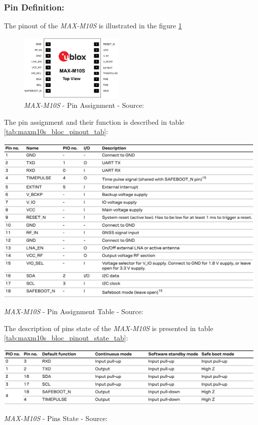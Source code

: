 \documentclass[report.tex]{subfiles}
\begin{document}
\subsubsection{Pin Definition:}

The pinout of the \textit{MAX-M10S} is illustrated in the figure \ref{fig:maxm10s_bloc_pinout}

\begin{figure}[H]
	\centering
	\includegraphics[width=0.45\textwidth]{Include/Figure/comp/maxm10s_bloc_pinout.png}
	\caption{\textit{MAX-M10S} - Pin Assignment - Source: \cite{MAXM10S}}
	\label{fig:maxm10s_bloc_pinout}
\end{figure}

The pin assignment and their function is described in table \ref{tab:maxm10s_bloc_pinout_tab}:

\begin{table}[H]
	\centering
	\includegraphics[width=1\textwidth]{Include/Figure/comp/maxm10s_bloc_pinout_tab.png}
\caption{\textit{MAX-M10S} - Pin Assignment Table - Source: \cite{MAXM10S}}
\label{tab:maxm10s_bloc_pinout_tab}
\end{table}

The description of pins state of the \textit{MAX-M10S} is presented in table \ref{tab:maxm10s_bloc_pinout_state_tab}:

\begin{table}[H]
	\centering
	\includegraphics[width=1\textwidth]{Include/Figure/comp/maxm10s_bloc_pinout_state_tab.png}
\caption{\textit{MAX-M10S} - Pins State - Source: \cite{MAXM10S}}
\label{tab:maxm10s_bloc_pinout_state_tab}
\end{table}
\end{document}
